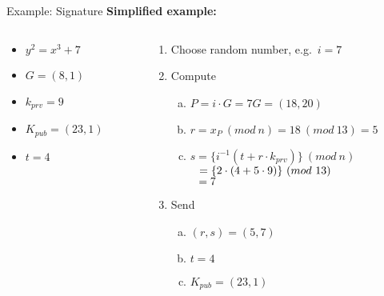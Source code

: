 \documentclass[]{beamer}
\begin{document}
\begin{frame}{Example: Signature}
	\textbf{Simplified example:}\\
	\begin{columns}[T]
		\begin{column}{0.3\textwidth}
			\begin{itemize}
				\item $y^2 = x^3 + 7$
				\item $G = (8, 1)$
				\item $k_{prv} = 9$
				\item $K_{pub} = (23, 1)$
				\item $t = 4$
			\end{itemize}
		\end{column}
		\begin{column}{0.7\textwidth}
			\begin{enumerate}
				\item<2-> Choose random number, e.g.\ $i = 7$
				\item<3-> Compute
				\begin{enumerate}[a.]
					\item<3-> $P = i \cdot G = 7G = (18,20)$\\
						\vspace{0.5em}
					\item<4-> $r = x_P\ (mod\ n) = 18\ (mod\ 13) = 5$\\
						\vspace{0.5em}
					\item<5-> $s = \{i^{-1} (t + r \cdot k_{prv})\}\ (mod\ n)$\\
						$\hphantom{s } = \{2 \cdot (4 + 5 \cdot 9)\}\ (mod\ 13)$\\
						$\hphantom{s } = 7$
				\end{enumerate}
				\item<6-> Send
				\begin{enumerate}[a.]
					\item<6-> $(r, s) = (5, 7)$\\
					\vspace{0.5em}
					\item<7-> $t = 4$\\
					\vspace{0.5em}
					\item<8-> $K_{pub} = (23, 1)$\\
					\vspace{0.5em}
				\end{enumerate}
			\end{enumerate}
		\end{column}
	\end{columns}
\end{frame}
\end{document}
